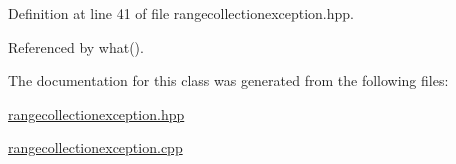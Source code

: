 \-Definition at line 41 of file rangecollectionexception.\-hpp.



\-Referenced by what().



\-The documentation for this class was generated from the following files\-:\begin{DoxyCompactItemize}
\item 
\hyperlink{rangecollectionexception_8hpp}{rangecollectionexception.\-hpp}\item 
\hyperlink{rangecollectionexception_8cpp}{rangecollectionexception.\-cpp}\end{DoxyCompactItemize}
